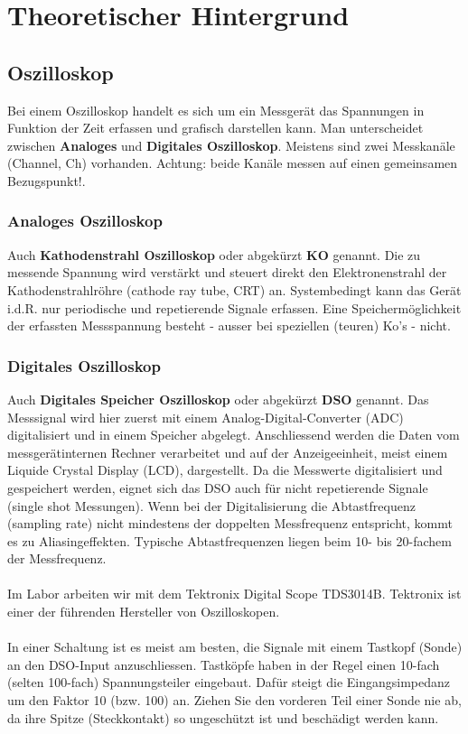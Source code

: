 \section{Theoretischer Hintergrund}
\subsection{Oszilloskop}
Bei einem Oszilloskop handelt es sich um ein Messgerät das Spannungen in Funktion der Zeit erfassen und grafisch darstellen kann. Man unterscheidet zwischen \textbf{Analoges} und \textbf{Digitales Oszilloskop}. Meistens sind zwei Messkanäle (Channel, Ch) vorhanden. Achtung: beide Kanäle messen auf einen gemeinsamen
Bezugspunkt!. 
\subsubsection{Analoges Oszilloskop}
Auch \textbf{Kathodenstrahl Oszilloskop} oder abgekürzt \textbf{KO} genannt. Die zu messende Spannung wird verstärkt und steuert direkt den Elektronenstrahl der Kathodenstrahlröhre (cathode ray tube, CRT) an. Systembedingt kann das Gerät i.d.R. nur periodische und repetierende Signale erfassen. Eine Speichermöglichkeit der erfassten Messspannung besteht - ausser bei speziellen (teuren) Ko's - nicht.
\subsubsection{Digitales Oszilloskop}
Auch \textbf{Digitales Speicher Oszilloskop} oder abgekürzt \textbf{DSO} genannt. Das Messsignal wird hier zuerst mit einem Analog-Digital-Converter (ADC) digitalisiert und in einem Speicher abgelegt. Anschliessend werden die Daten vom messgerätinternen Rechner verarbeitet und auf der Anzeigeeinheit, meist einem Liquide Crystal Display (LCD), dargestellt. Da die Messwerte digitalisiert und gespeichert werden, eignet sich das DSO auch für nicht repetierende Signale (single shot Messungen). Wenn bei der Digitalisierung die Abtastfrequenz (sampling rate) nicht mindestens der doppelten Messfrequenz entspricht, kommt es zu Aliasingeffekten. Typische Abtastfrequenzen liegen beim 10- bis 20-fachem der Messfrequenz.
\\\\
Im Labor arbeiten wir mit dem Tektronix Digital Scope TDS3014B. Tektronix ist einer der führenden Hersteller von Oszilloskopen.
\\\\
In einer Schaltung ist es meist am besten, die Signale mit einem Tastkopf (Sonde) an den DSO-Input anzuschliessen. Tastköpfe haben in der Regel einen 10-fach (selten 100-fach) Spannungsteiler eingebaut. Dafür steigt die Eingangsimpedanz um den Faktor 10 (bzw. 100) an. Ziehen Sie den vorderen Teil einer Sonde nie ab, da ihre Spitze (Steckkontakt) so ungeschützt ist und beschädigt werden kann.
